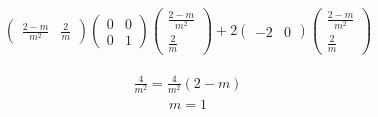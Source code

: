 \documentclass[10pt, a4paper]{article}
\newcommand{\myvec}[1]{\ensuremath{\begin{pmatrix}#1\end{pmatrix}}}
\begin{document}
\begin{align}
	\myvec{\frac{2 - m}{m^2} & \frac{2}{m}}\myvec{0&0\\0&1}\myvec{\frac{2 - m}{m^2} \\ \frac{2}{m}} + 2\myvec{-2 & 0}\myvec{\frac{2 - m}{m^2} \\ \frac{2}{m}}
\end{align}

\begin{align}
        \frac{4}{m^2} = \frac{4}{m^2} (2 - m)
\end{align}
\begin{align}
        m = 1
\end{align}
\fi
\end{document}
